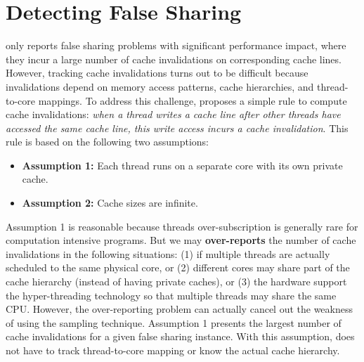 \section{Detecting False Sharing}
\label{sec:detect}

\cheetah{} only reports false sharing problems with significant performance impact, where they incur a large number of cache invalidations on corresponding cache lines. However, tracking cache invalidations turns out to be difficult because invalidations depend on memory access patterns, cache hierarchies, and thread-to-core mappings. 
To address this challenge, \cheetah{} proposes a simple rule to compute cache invalidations: \emph{when a thread writes a cache line after other threads have accessed the same cache line, this write access incurs a cache invalidation}. This rule is based on the following two assumptions:
 

\begin{itemize} 
\item {\bf Assumption 1:} Each thread runs on a separate core with its own private cache. 

\item {\bf Assumption 2: } Cache sizes are infinite. 
 
\end{itemize}

Assumption 1 is reasonable because threads over-subscription is generally rare for computation intensive programs. But we may {\bf over-reports} the number of cache invalidations in the following situations: (1) if multiple threads are actually scheduled to the same physical core, or (2) different cores may share part of the cache hierarchy (instead of having private caches), or (3) the hardware support the hyper-threading technology so that multiple threads may share the same CPU. However, the over-reporting problem can actually cancel out the weakness of using the sampling technique. Assumption 1 presents the largest number of cache invalidations for a given false sharing instance. With this assumption, \cheetah{} does not have to track thread-to-core mapping or know the actual cache hierarchy.

